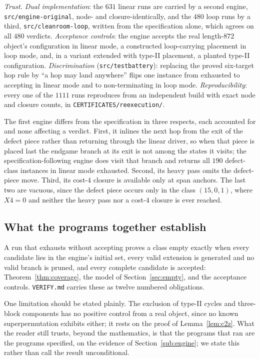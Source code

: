 \documentclass[10pt]{article}
\theoremstyle{remark}
\theoremstyle{plain}
\newcommand{\prog}[1]{\texttt{#1}}
\begin{document}
\emph{Trust.}  \emph{Dual implementation}: the $631$ linear runs are
carried by a second engine, \prog{src/\allowbreak engine-original},
node- and closure-identically, and the $480$ loop runs by a third,
\prog{src/\allowbreak cleanroom-loop}, written from the specification
alone, which agrees on all $480$ verdicts.  \emph{Acceptance controls}: the engine
accepts the real length-$872$ object's configuration in linear mode, a
constructed loop-carrying placement in loop mode, and, in a variant
extended with type-II placement, a planted type-II configuration.
\emph{Discrimination} (\prog{src/\allowbreak testbattery}): replacing
the proved six-target hop rule by ``a hop may land anywhere'' flips one
instance from exhausted to accepting in linear mode and to
non-terminating in loop mode.  \emph{Reproducibility}: every one of the $1111$ runs reproduces from
an independent build with exact node and closure counts, in
\prog{CERTIFICATES/\allowbreak reexecution/}.

The first engine differs from the specification in three respects,
each accounted for and none affecting a verdict.  First, it inlines
the next hop from the exit of the defect piece rather than returning
through the linear driver, so when that piece is placed last the
endgame branch at its exit is not among the states it visits; the
specification-following engine does visit that branch and returns all
$190$ defect-class instances in linear mode exhausted.  Second, its
heavy pass omits the defect-piece move.  Third, its cost-$4$ closure is
available only at span anchors.  The last two are vacuous, since the
defect piece occurs only in the class $(15,0,1)$, where $X4=0$ and
neither the heavy pass nor a cost-$4$ closure is ever reached.

\subsection{What the programs together establish}

A run that exhausts without accepting proves a class empty exactly when
every candidate lies in the engine's initial set, every valid extension
is generated and no valid branch is pruned, and every complete
candidate is accepted: Theorem~\ref{thm:coverage},
the model of Section~\ref{sec:empty}, and the acceptance controls.
\prog{VERIFY.md} carries these as twelve numbered obligations.

One limitation should be stated plainly.  The exclusion of type-II
cycles and three-block components has no positive control from a real
object, since no known superpermutation exhibits either; it rests on
the proof of Lemma~\ref{lem:c2z}.  What the reader still trusts, beyond
the mathematics, is that the programs that ran are the programs
specified, on the evidence of Section~\ref{sub:engine}; we state this
rather than call the result unconditional.
\end{document}
